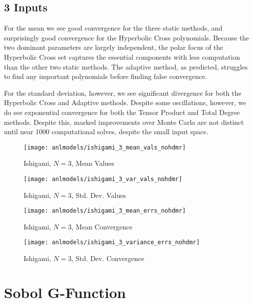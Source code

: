 \subsection{3 Inputs}
For the mean we see good convergence for the three static methods, and surprisingly good convergence for the
Hyperbolic Cross polynomials.  Because the two dominant parameters are largely independent, the polar focus of
the Hyperbolic Cross set captures the essential components with less computation than the other two static
methods.  The adaptive method, as predicted, struggles to find any important polynomials before finding false
convergence.

For the standard deviation, however, we see significant divergence for both the Hyperbolic Cross and Adaptive
methods.  Despite some oscillations, however, we do see exponential convergence for both the Tensor Product
and Total Degree methods.  Despite this, marked improvements over Monte Carlo are not distinct until near 1000
computational solves, despite the small input space.
\begin{figure}[H]
  \centering
  \texttt{[image: anlmodels/ishigami\_3\_mean\_vals\_nohdmr]}
  \caption{Ishigami, $N=3$, Mean Values}
  \label{fig:ishigami mean values 3}
\end{figure}
\begin{figure}[H]
  \centering
  \texttt{[image: anlmodels/ishigami\_3\_var\_vals\_nohdmr]}
  \caption{Ishigami, $N=3$, Std. Dev. Values}
  \label{fig:ishigami var values 3}
\end{figure}

\begin{figure}[H]
  \centering
  \texttt{[image: anlmodels/ishigami\_3\_mean\_errs\_nohdmr]}
  \caption{Ishigami, $N=3$, Mean Convergence}
  \label{fig:ishigami mean errors 3}
\end{figure}
\begin{figure}[H]
  \centering
  \texttt{[image: anlmodels/ishigami\_3\_variance\_errs\_nohdmr]}
  \caption{Ishigami, $N=3$, Std. Dev. Convergence}
  \label{fig:ishigami var errors 3}
\end{figure}


\section{Sobol G-Function}
